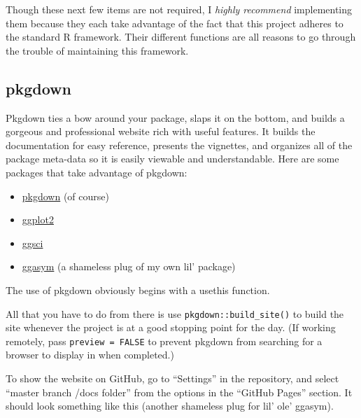 \documentclass[]{book}
\newenvironment{Shaded}{\begin{snugshade}}{\end{snugshade}}
\newcommand{\CommentTok}[1]{\textcolor[rgb]{0.56,0.35,0.01}{\textit{#1}}}
\newcommand{\KeywordTok}[1]{\textcolor[rgb]{0.13,0.29,0.53}{\textbf{#1}}}
\newcommand{\NormalTok}[1]{#1}
\newcommand{\OperatorTok}[1]{\textcolor[rgb]{0.81,0.36,0.00}{\textbf{#1}}}
\providecommand{\tightlist}{%
  \setlength{\itemsep}{0pt}\setlength{\parskip}{0pt}}
\begin{document}
Though these next few items are not required, I \emph{highly recommend} implementing them because they each take advantage of the fact that this project adheres to the standard R framework. Their different functions are all reasons to go through the trouble of maintaining this framework.

\hypertarget{pkgdown}{%
\subsection{pkgdown}\label{pkgdown}}

Pkgdown ties a bow around your package, slaps it on the bottom, and builds a gorgeous and professional website rich with useful features. It builds the documentation for easy reference, presents the vignettes, and organizes all of the package meta-data so it is easily viewable and understandable. Here are some packages that take advantage of pkgdown:

\begin{itemize}
\tightlist
\item
  \href{https://pkgdown.r-lib.org}{pkgdown} (of course)
\item
  \href{https://ggplot2.tidyverse.org}{ggplot2}
\item
  \href{https://nanx.me/ggsci/}{ggsci}
\item
  \href{https://jhrcook.github.io/ggasym/index.html}{ggasym} (a shameless plug of my own lil' package)
\end{itemize}

The use of pkgdown obviously begins with a usethis function.

\begin{Shaded}
\end{Shaded}

All that you have to do from there is use \texttt{pkgdown::build\_site()} to build the site whenever the project is at a good stopping point for the day. (If working remotely, pass \texttt{preview\ =\ FALSE} to prevent pkgdown from searching for a browser to display in when completed.)

To show the website on GitHub, go to ``Settings'' in the repository, and select ``master branch /docs folder'' from the options in the ``GitHub Pages'' section. It should look something like this (another shameless plug for lil' ole' ggasym).
\end{document}

